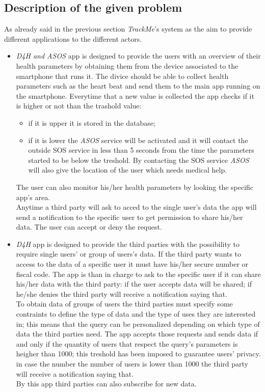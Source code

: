 \subsection{Description of the given problem}

As already said in the previous section \textit{TrackMe}'s system as the aim to provide different applications to the different actors.
\begin{itemize}
	\item {\textit{D4H and ASOS} app is designed to provide the users with an overview of their health parameters by obtaining 				them from the device associated to the smartphone that runs it. The divice should be able to collect health parameters 				such as the heart beat and send them to the main app running on the smartphone. Everytime that a new value is 				collected the app checks if it is higher or not than the trashold value:
		\begin{itemize}
			\item {if it is upper it is stored in the database;}
			\item {if it is lower the \textit{ASOS} service will be activated and it will contact the outside SOS service in less 						than 5 seconds from the time the parameters started to be below the treshold. By contacting the SOS 						service \textit{ASOS} will also give the location of the user which needs medical help.}
		\end{itemize}
		The user can also monitor his/her health parameters by looking the specific app's area.\\
		Anytime a third party will ask to acced to the single user's data the app will send a notification to the specific user to get 			permission to share his/her data. The user can accept or deny the request.}

	\item{\textit{D4H} app is designed to provide the third parties with the possibility to require single users' or group of users's  				data.
		If the third party wants to access to the data of  a specific user it must have his/her secure number or fiscal code. 				The app is than in charge to ask to the specific user if it can share his/her data with the third party: if the user 					accepts data will be shared; if he/she denies the third party will receive a notification saying that.\\
		To obtain data of groups of users the third parties must specify some contraints to define the type of data and the type 			of uses they are interested in; this means that the query can be personalized depending on which type of data the third 			parties need. The app accepts those requests and sends data if and only if the quantity of users that respect the 				query's parameters is heigher than 1000; this treshold has been imposed to guarantee users' privacy. in case the number 			the number of users is lower than 1000 the third party will receive a notification saying that.\\
		By this app third parties can also subscribe for new data.}
		
\end{itemize}